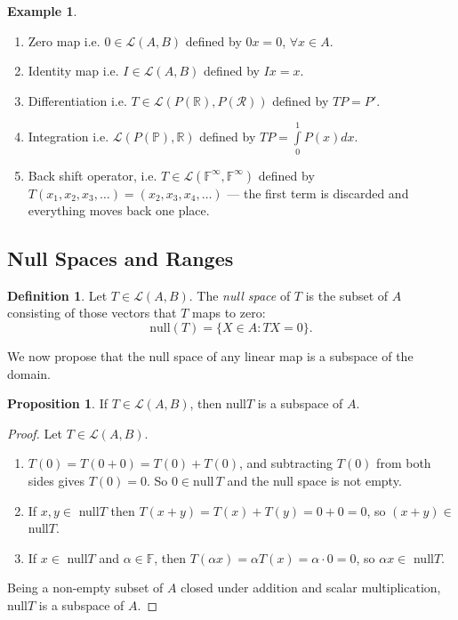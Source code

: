\documentclass[11pt,a4paper]{article}
\theoremstyle{definition}
\newtheorem{defn}[thm]{Definition}
\newtheorem{exa}[thm]{Example}
\newtheorem{prop}[thm]{Proposition}
\begin{document}
\begin{exa}
\begin{enumerate}
\item[i.] Zero map i.e. $0\in \mathcal{L}(A,B)$ defined by $0x=0$, $\forall x\in A$.
\item[ii.] Identity map i.e. $I\in \mathcal{L}(A,B)$ defined by $Ix=x$.
\item[iii.] Differentiation i.e. $T\in \mathcal{L}(P(\mathbb{R}),P(\mathcal{R}))$ defined by $TP=P'$.
\item[iv.] Integration i.e. $\mathcal{L}(P(\mathbb{P}),\mathbb{R})$ defined by $TP=\int\limits^1_0P(x)dx$.
\item[v.] Back shift operator, i.e. $T\in \mathcal{L}(\mathbb{F}^{\infty},\mathbb{F}^{\infty})$
defined by $T(x_1,x_2,x_3,\dots)=(x_2,x_3,x_4,\dots)$ --- the first term is
discarded and everything moves back one place.
\end{enumerate}
\end{exa}


\subsection{Null Spaces and Ranges}
\begin{defn}
Let $T\in \mathcal{L}(A,B)$. The \emph{null space} of $T$ is the subset of $A$
consisting of those vectors that $T$ maps to zero:
$$\text{null}(T)=\{X\in A: TX=0\}.$$
\end{defn}
We now propose that the null space of any linear map is a subspace of the
domain.


\begin{prop}
If $T\in \mathcal{L}(A,B)$, then null$T$ is a subspace of $A$.
\end{prop}


\begin{proof}
Let $T\in \mathcal{L}(A,B)$.
\begin{enumerate}
\item[i.] $T(0)=T(0+0)=T(0)+T(0)$, and subtracting $T(0)$ from both sides gives
$T(0)=0$. So $0\in\text{null}\,T$ and the null space is not empty.
\item[ii.] If $x,y\in$ null$T$ then $T(x+y)=T(x)+T(y)=0+0=0$, so
$(x+y)\in$ null$T$.
\item[iii.] If $x\in$ null$T$ and $\alpha \in \mathbb{F}$, then
$T(\alpha x)=\alpha T(x)=\alpha\cdot 0=0$, so $\alpha x\in$ null$T$.
\end{enumerate}
Being a non-empty subset of $A$ closed under addition and scalar
multiplication, null$T$ is a subspace of $A$.
\end{proof}
\end{document}
